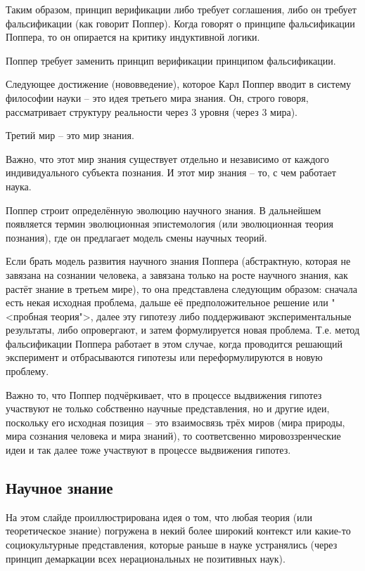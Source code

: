 \documentclass[main.tex]{subfiles}
\begin{document}
Таким образом, принцип верификации либо требует соглашения, либо он требует фальсификации (как говорит Поппер).
Когда говорят о принципе фальсификации Поппера, то он опирается на критику индуктивной логики.

Поппер требует заменить принцип верификации принципом фальсификации.


Следующее достижение (нововведение), которое Карл Поппер вводит в систему философии науки -- это идея третьего мира знания.
Он, строго говоря, рассматривает структуру реальности через 3 уровня (через 3 мира).

Третий мир -- это мир знания.

Важно, что этот мир знания существует отдельно и независимо от каждого индивидуального субъекта познания.
И этот мир знания -- то, с чем работает наука.


Поппер строит определённую эволюцию научного знания.
В дальнейшем появляется термин эволюционная эпистемология (или эволюционная теория познания), где он предлагает модель смены научных теорий.

Если брать модель развития научного знания Поппера (абстрактную, которая не завязана на сознании человека, а завязана только на росте научного знания, как растёт знание в третьем мире), то она представлена следующим образом: сначала есть некая исходная проблема, дальше её предположительное решение или "<пробная теория">, далее эту гипотезу либо поддерживают экспериментальные результаты, либо опровергают, и затем формулируется новая проблема.
Т.е. метод фальсификации Поппера работает в этом случае, когда проводится решающий эксперимент и отбрасываются гипотезы или переформулируются в новую проблему. 

Важно то, что Поппер подчёркивает, что в процессе выдвижения гипотез участвуют не только собственно научные представления, но и другие идеи, поскольку его исходная позиция -- это взаимосвязь трёх миров (мира природы, мира сознания человека и мира знаний), то соответсвенно мировоззренческие идеи и так далее тоже участвуют в процессе выдвижения гипотез.

\subsection{Научное знание}


На этом слайде проиллюстрирована идея о том, что любая теория (или теоретическое знание) погружена в некий более широкий контекст или какие-то социокультурные представления, которые раньше в науке устранялись (через принцип демаркации всех нерациональных не позитивных наук).
\end{document}
